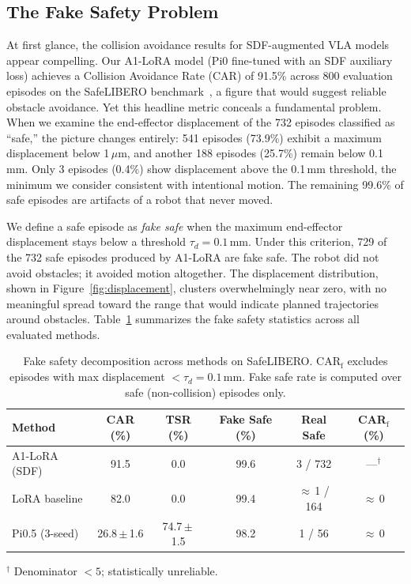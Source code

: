 \subsection{The Fake Safety Problem}\label{sec:fake_safety}

At first glance, the collision avoidance results for SDF-augmented VLA models appear compelling. Our A1-LoRA model (Pi0 fine-tuned with an SDF auxiliary loss) achieves a Collision Avoidance Rate (CAR) of 91.5\% across 800 evaluation episodes on the SafeLIBERO benchmark~\cite{hu2025vlsa}, a figure that would suggest reliable obstacle avoidance. Yet this headline metric conceals a fundamental problem. When we examine the end-effector displacement of the 732 episodes classified as ``safe,'' the picture changes entirely: 541 episodes (73.9\%) exhibit a maximum displacement below 1\,$\mu$m, and another 188 episodes (25.7\%) remain below 0.1\,mm. Only 3 episodes (0.4\%) show displacement above the 0.1\,mm threshold, the minimum we consider consistent with intentional motion. The remaining 99.6\% of safe episodes are artifacts of a robot that never moved.

We define a safe episode as \emph{fake safe} when the maximum end-effector displacement stays below a threshold $\tau_d = 0.1$\,mm. Under this criterion, 729 of the 732 safe episodes produced by A1-LoRA are fake safe. The robot did not avoid obstacles; it avoided motion altogether. The displacement distribution, shown in Figure~\ref{fig:displacement}, clusters overwhelmingly near zero, with no meaningful spread toward the range that would indicate planned trajectories around obstacles. Table~\ref{tab:fake_safety} summarizes the fake safety statistics across all evaluated methods.

\begin{table}[t]
\centering
\caption{Fake safety decomposition across methods on SafeLIBERO. CAR$_\text{f}$ excludes episodes with max displacement $< \tau_d = 0.1$\,mm. Fake safe rate is computed over safe (non-collision) episodes only.}
\label{tab:fake_safety}
\vspace{2pt}
\small
\begin{tabular}{lccccc}
\toprule
Method & CAR (\%) & TSR (\%) & Fake Safe (\%) & Real Safe & CAR$_\text{f}$ (\%) \\
\midrule
A1-LoRA (SDF) & 91.5 & 0.0 & 99.6 & 3 / 732 & ---$^\dagger$ \\
LoRA baseline  & 82.0 & 0.0 & 99.4 & $\approx$\,1 / 164 & $\approx$\,0 \\
Pi0.5 (3-seed) & 26.8\,$\pm$\,1.6 & 74.7\,$\pm$\,1.5 & 98.2 & 1 / 56 & $\approx$\,0 \\
\bottomrule
\end{tabular}
\vspace{2pt}
{\footnotesize $^\dagger$ Denominator $< 5$; statistically unreliable.}
\end{table}

